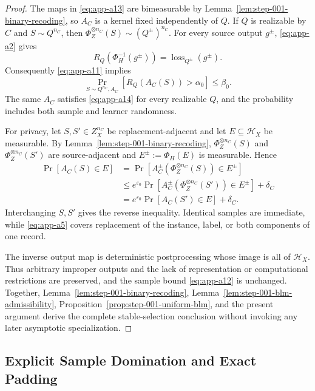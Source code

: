 \begin{proof}
The maps in \eqref{eq:app-a13} are bimeasurable by
Lemma~\ref{lem:step-001-binary-recoding}, so \(A_C\) is a kernel fixed
independently of \(Q\).  If \(Q\) is realizable by \(C\) and
\(S\sim Q^{n_C}\), then
\(\Phi_Z^{\otimes n_C}(S)\sim(Q^\pm)^{n_C}\).  For every source output
\(g^\pm\), \eqref{eq:app-a2} gives
\[
R_Q(\Phi_H^{-1}(g^\pm))
=\operatorname{loss}_{Q^\pm}(g^\pm).
\]
Consequently \eqref{eq:app-a11} implies
\begin{equation}
\Pr_{S\sim Q^{n_C},A_C}
[R_Q(A_C(S))>\alpha_0]\leq\beta_0.
\label{eq:app-a14}
\end{equation}
The same \(A_C\) satisfies \eqref{eq:app-a14} for every realizable \(Q\), and the
probability includes both sample and learner randomness.

For privacy, let \(S,S'\in Z_X^{n_C}\) be replacement-adjacent and let
\(E\subseteq\mathcal H_X\) be measurable.  By
Lemma~\ref{lem:step-001-binary-recoding},
\(\Phi_Z^{\otimes n_C}(S)\) and
\(\Phi_Z^{\otimes n_C}(S')\) are source-adjacent and
\(E^\pm:=\Phi_H(E)\) is measurable.  Hence
\begin{equation}
\begin{aligned}
\Pr[A_C(S)\in E]
&=\Pr[A_C^\pm(\Phi_Z^{\otimes n_C}(S))\in E^\pm]\\
&\leq e^{\varepsilon_0}
\Pr[A_C^\pm(\Phi_Z^{\otimes n_C}(S'))\in E^\pm]
+\delta_C\\
&=e^{\varepsilon_0}\Pr[A_C(S')\in E]+\delta_C.
\end{aligned}
\label{eq:app-a15}
\end{equation}
Interchanging \(S,S'\) gives the reverse inequality.  Identical
samples are immediate, while \eqref{eq:app-a5} covers replacement of the
instance, label, or both components of one record.

The inverse output map is deterministic postprocessing whose image is
all of \(\mathcal H_X\).  Thus arbitrary improper outputs and the lack
of representation or computational restrictions are preserved, and
the sample bound \eqref{eq:app-a12} is unchanged.  Together,
Lemma~\ref{lem:step-001-binary-recoding},
Lemma~\ref{lem:step-001-blm-admissibility},
Proposition~\ref{prop:step-001-uniform-blm}, and the present argument
derive the complete stable-selection conclusion without invoking any
later asymptotic specialization.
\end{proof}
\subsection{Explicit Sample Domination and Exact Padding}
\label{app:sample-domination}

